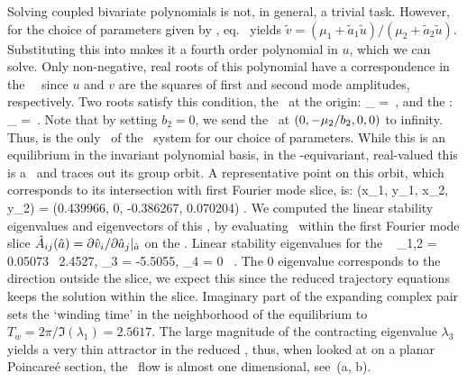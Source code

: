 Solving coupled bivariate polynomials  is not, in general, a trivial task. However,
for the choice of parameters given by , eq.~ yields
$\tilde{v} = (\mu_1 + \tilde{a}_1 \tilde{u})/(\mu_2 + \tilde{a}_2
\tilde{u})$. Substituting this into  makes it a fourth order polynomial in $u$,
which we can solve. Only non-negative, real roots of this polynomial have a correspondence in the \twomode\
\statesp\ since $u$ and $v$ are the squares of first and second mode amplitudes,
respectively. Two roots satisfy this condition, the \eqv\ at the origin:
\beq
	\invpol_{\EQV{}} = \,, %
and the \reqv:
\beq
	\invpol_{\REQV{}{}} = \,.
\ee{eq:reqv}
Note that by setting $b_2 = 0$, we send the \reqv\ at
$\cartpt{0,-\mu_2/b_2,0,0}$ to infinity. Thus,  is the
only \reqv\ of the \twomode\ system for our choice of parameters. While
this is an equilibrium in the invariant polynomial basis, in the
\SOn{2}-equivariant, real-valued \statesp this is a \reqv\ and traces out
its group orbit. A representative point on this orbit, which corresponds
to its intersection with first Fourier mode slice, is:
\beq
  \left(x_1, y_1, x_2, y_2\right) = \left(0.439966, 0, -0.386267, 0.070204\right) .
  \label{e-req}
\eeq
We computed the linear stability eigenvalues and eigenvectors of this \reqv
, by evaluating \stabmat\ within the first Fourier mode slice
$\hat{{A}}_{ij} (\hat{a}) = \partial \hat{{v}}_i / \partial \hat{a}_j |_{\hat{a}}$
on the \reqv . Linear stability eigenvalues for the \reqv\ \refeq{e-req}
\beq
	\lambda_{1,2} = 0.05073 \pm \ii \, 2.4527, \quad
	\lambda_3 = -5.5055, \quad \lambda_4 = 0 \, .
\eeq
The $0$ eigenvalue corresponds to the direction outside the slice, we expect
this since the reduced trajectory equations \refeq{eq:intSlice} keeps the
solution within the slice. Imaginary part of the expanding complex pair sets
the `winding time' in the neighborhood of the equilibrium to
$T_w = 2 \pi / \Im(\lambda_1) = 2.5617$. The large magnitude of the
contracting eigenvalue $\lambda_3$ yields a very thin attractor in the
reduced \statesp , thus, when looked at on a planar Poincare\'{e} section,
the \twomode\ flow is almost one dimensional, see \,(a, b).


